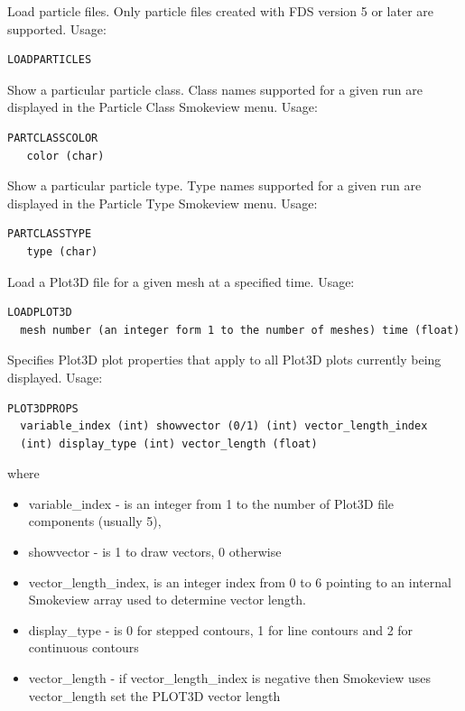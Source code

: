 \documentclass[11pt,twoside]{book}
\newcommand{\hitem}[1]{\item[{\bf #1} \hfill]}
\begin{document}
\hitem{LOADPARTICLES}Load particle files.  Only particle files created with FDS version 5 or
later are supported.
Usage:
\begin{lstlisting}
LOADPARTICLES
\end{lstlisting}

\hitem{PARTCLASSCOLOR}Show a particular particle class.  Class names supported for a given
run are displayed in the Particle Class Smokeview menu.
Usage:
\begin{lstlisting}
PARTCLASSCOLOR
   color (char)
\end{lstlisting}

\hitem{PARTCLASSTYPE}Show a particular particle type.  Type names supported for a given
run are displayed in the Particle Type Smokeview menu.
Usage:
\begin{lstlisting}
PARTCLASSTYPE
   type (char)
\end{lstlisting}

\hitem{LOADPLOT3D}Load a Plot3D file for a given mesh at a specified time.
Usage:
\begin{lstlisting}
LOADPLOT3D
  mesh number (an integer form 1 to the number of meshes) time (float)
\end{lstlisting}

\hitem{PLOT3DPROPS}Specifies Plot3D plot properties that
apply to all Plot3D plots currently being displayed.
Usage:
\begin{lstlisting}
PLOT3DPROPS
  variable_index (int) showvector (0/1) (int) vector_length_index
  (int) display_type (int) vector_length (float)
\end{lstlisting}
where
\begin{itemize}
\item variable\_index - is an integer from 1 to the number of
Plot3D file components (usually 5),
\item showvector - is 1 to draw vectors, 0 otherwise
\item vector\_length\_index, is an integer index from 0 to 6
pointing to an internal Smokeview array used to determine vector length.
\item display\_type - is 0 for stepped contours, 1 for line
contours and 2 for continuous contours
\item vector\_length - if vector\_length\_index is negative
then Smokeview uses vector\_length set the PLOT3D vector length
\end{itemize}
\end{document}
